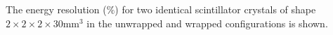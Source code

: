 \label{fig:energyresolution} The energy resolution ($\%$) for two identical scintillator crystals of shape $2\times2\times2\times30$mm$^3$ in the unwrapped and wrapped configurations is shown.